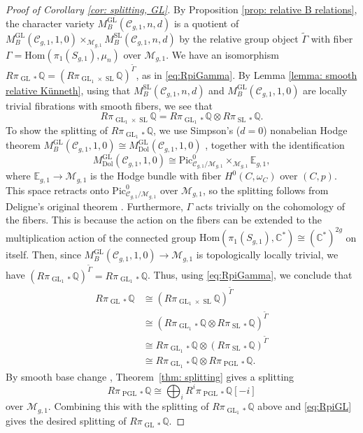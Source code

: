 \documentclass[11pt,reqno]{amsart}
\theoremstyle{plain} %
\theoremstyle{definition}
\newcommand{\QQ}{\mathbb{Q}}
\newcommand{\CC}{\mathbb{C}}
\newcommand{\Hom}{\mathrm{Hom}}
\newcommand{\M}{\mathcal{M}}
\newcommand{\C}{\mathcal{C}}
\DeclareMathOperator{\GL}{GL}
\DeclareMathOperator{\SL}{SL}
\DeclareMathOperator{\PGL}{PGL}
\newcommand{\Dol}{\mathrm{Dol}}
\newcommand{\Pic}{\mathrm{Pic}}
\begin{document}
\begin{proof}[Proof of Corollary \ref{cor: splitting, GL}]
    By Proposition \ref{prop: relative B relations}, the character variety $M_B^{\GL}(\C_{g,1},n,d)$ is a quotient of $M_B^{\GL}(\C_{g,1},1,0) \times_{\M_{g,1}} M_B^{\SL}(\C_{g,1},n,d)$ by the relative group object $\widetilde\Gamma$ with fiber $\Gamma = \Hom(\pi_1(S_{g,1}), \mu_n)$ %
    over $\M_{g,1}$. %
	We have an isomorphism $R\pi_{\GL *} \QQ = (R\pi_{\GL_1 \times \SL} \QQ)^{\widetilde\Gamma}$, as in \eqref{eq:RpiGamma}.  
    By Lemma \ref{lemma: smooth relative Künneth}, using that $M_B^{\SL}(\C_{g,1},n,d)$ and $M_B^{\GL}(\C_{g,1},1,0)$ are locally trivial fibrations with smooth fibers, we see that
    $$R\pi_{\GL_1 \times \SL} \QQ = R\pi_{\GL_1 *} \QQ \otimes R\pi_{\SL *} \QQ.$$
    To show the splitting of $R\pi_{\GL_1 *} \QQ$, we use Simpson's ($d = 0$) nonabelian Hodge theorem
    $M_B^{\GL}(\C_{g,1},1,0) \cong M_\Dol^{\GL}(\C_{g,1},1,0)$
    \cite[Proposition~6.8 and Theorem~7.18]{Simpson-reps2}, together with the identification
    \[
    M_\Dol^{\GL}(\C_{g,1},1,0)
    \cong
    \Pic_{\C_{g,1}/\M_{g,1}}^0 \times_{\M_{g,1}} \mathbb E_{g,1},
    \]
    where $\mathbb E_{g,1}\to\M_{g,1}$ is the Hodge bundle with fiber $H^0(C,\omega_C)$ over $(C,p)$. This space retracts onto $\Pic_{\C_{g,1}/\M_{g,1}}^0$ over $\M_{g,1}$, so the splitting follows from Deligne's original theorem \cite[Proposition~2.1]{DeligneE2}.
    Furthermore, $\Gamma$ acts trivially on the cohomology of the fibers. This is because the action on the fibers can be extended to the multiplication action of the connected group $\Hom(\pi_1(S_{g,1}), \CC^*) \cong (\CC^*)^{2g}$ on itself. Then, since $M_B^{\GL}(\C_{g,1},1,0) \to \M_{g,1}$ is topologically locally trivial, we have $(R\pi_{\GL_1 *} \QQ)^{\widetilde\Gamma} = R\pi_{\GL_1 *} \QQ$. Thus, using \eqref{eq:RpiGamma}, we conclude that
    \begin{equation} \label{eq:RpiGL}
    \begin{aligned}
    R\pi_{\GL *} \QQ
    &\cong (R\pi_{\GL_1 \times \SL} \QQ)^{\widetilde\Gamma} \\
    &\cong (R\pi_{\GL_1 *} \QQ \otimes R\pi_{\SL *} \QQ)^{\widetilde\Gamma} \\
    &\cong R\pi_{\GL_1 *} \QQ \otimes (R\pi_{\SL *} \QQ)^{\widetilde\Gamma} \\
    &\cong R\pi_{\GL_1 *} \QQ \otimes R\pi_{\PGL *} \QQ.
    \end{aligned}
    \end{equation}
    By smooth base change \cite[Theorem~3.2.13(ii)]{Dimca}, Theorem~\ref{thm: splitting} gives a splitting
    \[
    R\pi_{\PGL *}\QQ \cong \bigoplus_i R^i\pi_{\PGL *}\QQ[-i]
    \]
    over $\M_{g,1}$. Combining this with the splitting of $R\pi_{\GL_1 *}\QQ$ above and \eqref{eq:RpiGL} gives the desired splitting of $R\pi_{\GL *}\QQ$.
\end{proof}
\end{document}
